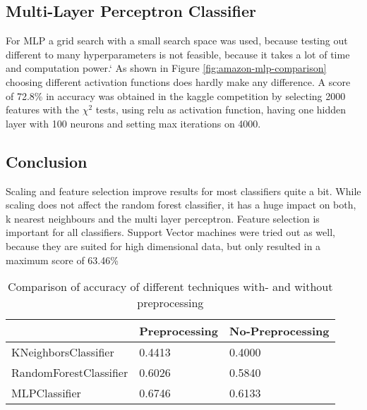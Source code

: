 \subsection{Multi-Layer Perceptron Classifier}

For MLP a grid search with a small search space was used, because testing out different to many hyperparameters is not feasible, because it takes a lot of time and computation power.`
As shown in Figure \ref{fig:amazon-mlp-comparison} choosing different activation functions does hardly make any difference.
A score of 72.8\% in accuracy was obtained in the kaggle competition by  selecting 2000 features with the ${\chi}^2$ tests, using relu as activation function, having one hidden layer with 100 neurons and setting max iterations on 4000.



\subsection{Conclusion}

Scaling and feature selection improve results for most classifiers quite a bit. While scaling does not affect the random forest classifier, it has a huge impact on both, k nearest neighbours and the multi layer perceptron. Feature selection is important for all classifiers. Support Vector machines were tried out as well, because they are suited for high dimensional data, but only resulted in a maximum score of 63.46\%

\begin{table}[ht]
\begin{center}
\begin{tabular}{|l|l|l|}
\hline
                       & Preprocessing & No-Preprocessing \\ \hline
KNeighborsClassifier   & 0.4413        & 0.4000           \\ \hline
RandomForestClassifier & 0.6026        & 0.5840           \\ \hline
MLPClassifier          & 0.6746        & 0.6133           \\ \hline
\end{tabular}
\caption{Comparison of accuracy of different techniques with- and without preprocessing}
\end{center}
\end{table}

